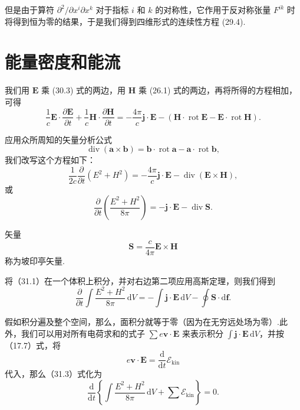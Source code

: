 但是由于算符 $\partial^2/\partial x^i\partial x^k$ 对于指标 $i$ 和 $k$
的对称性，它作用于反对称张量 $F^{ik}$
时将得到恒为零的结果，于是我们得到四维形式的连续性方程 (29.4).

\section{能量密度和能流}

我们用 $\boldsymbol{E}$ 乘 (30.3) 式的两边，用 $\boldsymbol{H}$ 乘 (26.1)
式的两边，再将所得的方程相加，可得
\begin{equation*}
  \frac{1}{c}\boldsymbol{E}\cdot\frac{\partial\boldsymbol{E}}{\partial t}
  +\frac{1}{c}\boldsymbol{H}\cdot\frac{\partial\boldsymbol{H}}{\partial t}
  =-\frac{4\pi}{c}\boldsymbol{j}\cdot\boldsymbol{E}
  -\left(\boldsymbol{H}\cdot\operatorname{rot}\boldsymbol{E}
  -\boldsymbol{E}\cdot\operatorname{rot}\boldsymbol{H}\right).
\end{equation*}

应用众所周知的矢量分析公式
\begin{equation*}
  \operatorname{div}\left(\boldsymbol{a}\times\boldsymbol{b}\right)
  =\boldsymbol{b}\cdot\operatorname{rot}\boldsymbol{a}
  -\boldsymbol{a}\cdot\operatorname{rot}\boldsymbol{b},
\end{equation*}
我们改写这个方程如下：
\begin{equation*}
  \frac{1}{2c}\frac{\partial}{\partial t}\left(E^2+H^2\right)
  =-\frac{4\pi}{c}\boldsymbol{j}\cdot\boldsymbol{E}
  -\operatorname{div}\left(\boldsymbol{E}\times\boldsymbol{H}\right),
\end{equation*}
或
\begin{equation}
  \frac{\partial}{\partial t}\left(\frac{E^2+H^2}{8\pi}\right)
  =-\boldsymbol{j}\cdot\boldsymbol{E}-\operatorname{div}\boldsymbol{S}.
\end{equation}

矢量
\begin{equation}
  \boldsymbol{S}=\frac{c}{4\pi}\boldsymbol{E}\times\boldsymbol{H}
\end{equation}
称为坡印亭矢量.

将（31.1）在一个体积上积分，并对右边第二项应用高斯定理，则我们得到
\begin{equation}
  \frac{\partial}{\partial t}\int\frac{E^2+H^2}{8\pi}\,\mathrm{d}V
  =-\int\boldsymbol{j}\cdot\boldsymbol{E}\,\mathrm{d}V
  -\oint\boldsymbol{S}\cdot\mathrm{d}\boldsymbol{f}.
\end{equation}

假如积分遍及整个空间，那么，面积分就等于零（因为在无穷远处场为零）.此外，我们可以用对所有电荷求和的式子
$\sum e\boldsymbol{v}\cdot\boldsymbol{E}$ 来表示积分
$\int\boldsymbol{j}\cdot\boldsymbol{E}\,\mathrm{d}V$，并按（17.7）式，将
\begin{equation*}
  e\boldsymbol{v}\cdot\boldsymbol{E}
  =\frac{\mathrm{d}}{\mathrm{d}t}\mathcal{E}_\mathrm{kin}
\end{equation*}
代入，那么（31.3）式化为
\begin{equation}
  \frac{\mathrm{d}}{\mathrm{d}t}\left\{\int\frac{E^2+H^2}{8\pi}\,\mathrm{d}V
  +\sum\mathcal{E}_\mathrm{kin}\right\}=0.
\end{equation}

